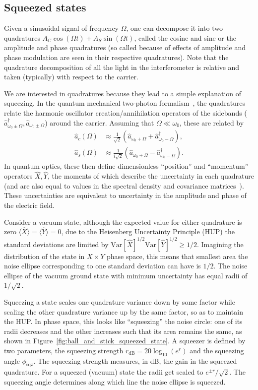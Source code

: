 \documentclass[aps,pra,superscriptaddress,reprint,nofootinbib]{revtex4-1}
\begin{document}
\subsection{Squeezed states}

Given a sinusoidal signal of frequency $\Omega$, one can decompose it into two quadratures $A_C \cos(\Omega t) + A_S \sin(\Omega t)$, called the cosine and sine or the amplitude and phase quadratures (so called because of effects of amplitude and phase modulation are seen in their respective quadratures). Note that the quadrature decomposition of all the light in the interferometer is relative and taken (typically) with respect to the carrier.


We are interested in quadratures because they lead to a simple explanation of squeezing. In the quantum mechanical two-photon formalism~\cite{Danilishin_2012}, the quadratures relate the harmonic oscillator creation/annihilation operators of the sidebands ($\hat{a}_{\omega_0 \pm \Omega}^\dagger, \hat{a}_{\omega_0 \pm \Omega}$) around the carrier. Assuming that $\Omega \ll \omega_0$, these are related by
\begin{align}
\hat{a}_c(\Omega) &\approx \frac{1}{\sqrt{2}} (\hat{a}_{\omega_0 + \Omega} + \hat{a}_{\omega_0 - \Omega}^\dagger),\\
\hat{a}_s(\Omega) &\approx \frac{1}{i \sqrt{2}} (\hat{a}_{\omega_0 + \Omega} - \hat{a}_{\omega_0 - \Omega}^\dagger).
\end{align}
In quantum optics, these then define dimensionless “position” and “momentum” operators $\hat{X}, \hat{Y}$, the moments of which describe the uncertainty in each quadrature (and are also equal to values in the spectral density and covariance matrices~\cite{Danilishin_2012}). These uncertainties are equivalent to uncertainty in the amplitude and phase of the electric field.


Consider a vacuum state, although the expected value for either quadrature is zero $\langle \hat{X} \rangle = \langle \hat{Y} \rangle = 0$, due to the Heisenberg Uncertainty Principle (HUP) the standard deviations are limited by $\mathrm{Var}[\hat{X}]^{1/2} \mathrm{Var}[\hat{Y}]^{1/2} \geq 1/2$. Imagining the distribution of the state in $X \times Y$ phase space, this means that smallest area the noise ellipse corresponding to one standard deviation can have is $1/2$. The noise ellipse of the vacuum ground state with minimum uncertainty has equal radii of $1/\sqrt{2}$.


Squeezing a state scales one quadrature variance down by some factor while scaling the other quadrature variance up by the same factor, so as to maintain the HUP. In phase space, this looks like “squeezing” the noise circle: one of its radii decreases and the other increases such that its area remains the same, as shown in Figure~\ref{fig:ball_and_stick_squeezed_state}. A squeezer is defined by two parameters, the squeezing strength $r_{\mathrm{dB}} = 20 \log_{10}(e^r)$ and the squeezing angle $\phi_{\mathrm{sqz}}$. The squeezing strength measures, in dB, the gain in the squeezed quadrature. For a squeezed (vacuum) state the radii get scaled to $e^{\pm r}/\sqrt{2}$. The squeezing angle determines along which line the noise ellipse is squeezed.
\end{document}
